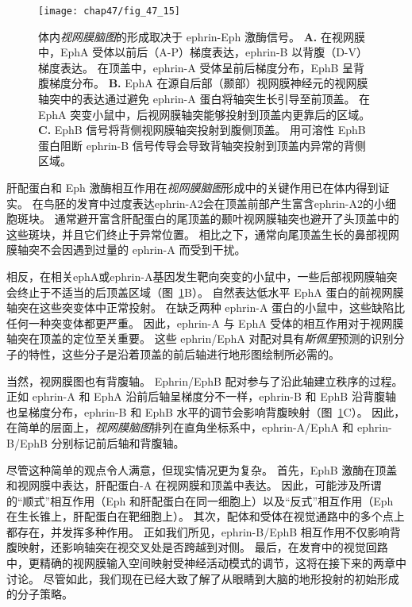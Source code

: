 \begin{figure}[htbp]
	\centering
	\texttt{[image: chap47/fig\_47\_15]}
	\caption{体内\textit{视网膜脑图}的形成取决于 ephrin-Eph 激酶信号。
		\textbf{A.} 在视网膜中，EphA 受体以前后（A-P）梯度表达，ephrin-B 以背腹（D-V）梯度表达。 
		在顶盖中，ephrin-A 受体呈前后梯度分布，EphB 呈背腹梯度分布。
		\textbf{B.} EphA 在源自后部（颞部）视网膜神经元的视网膜轴突中的表达通过避免 ephrin-A 蛋白将轴突生长引导至前顶盖。
		在 EphA 突变小鼠中，后视网膜轴突能够投射到顶盖内更靠后的区域。
		\textbf{C.} EphB 信号将背侧视网膜轴突投射到腹侧顶盖。
		用可溶性 EphB 蛋白阻断 ephrin-B 信号传导会导致背轴突投射到顶盖内异常的背侧区域。}
	\label{fig:47_15}
\end{figure}


肝配蛋白和 Eph 激酶相互作用在\textit{视网膜脑图}形成中的关键作用已在体内得到证实。
在鸟胚的发育中过度表达ephrin-A2会在顶盖前部产生富含ephrin-A2的小细胞斑块。
通常避开富含肝配蛋白的尾顶盖的颞叶视网膜轴突也避开了头顶盖中的这些斑块，并且它们终止于异常位置。
相比之下，通常向尾顶盖生长的鼻部视网膜轴突不会因遇到过量的 ephrin-A 而受到干扰。


相反，在相关ephA或ephrin-A基因发生靶向突变的小鼠中，一些后部视网膜轴突会终止于不适当的后顶盖区域（图~\ref{fig:47_15}B）。
自然表达低水平 EphA 蛋白的前视网膜轴突在这些突变体中正常投射。
在缺乏两种 ephrin-A 蛋白的小鼠中，这些缺陷比任何一种突变体都更严重。
因此，ephrin-A 与 EphA 受体的相互作用对于视网膜轴突在顶盖的定位至关重要。
这些 ephrin/EphA 对配对具有\textit{斯佩里}预测的识别分子的特性，这些分子是沿着顶盖的前后轴进行地形图绘制所必需的。


当然，视网膜图也有背腹轴。
Ephrin/EphB 配对参与了沿此轴建立秩序的过程。
正如 ephrin-A 和 EphA 沿前后轴呈梯度分不一样，ephrin-B 和 EphB 沿背腹轴也呈梯度分布，ephrin-B 和 EphB 水平的调节会影响背腹映射（图~\ref{fig:47_15}C）。
因此，在简单的层面上，\textit{视网膜脑图}排列在直角坐标系中，ephrin-A/EphA 和 ephrin-B/EphB 分别标记前后轴和背腹轴。


尽管这种简单的观点令人满意，但现实情况更为复杂。
首先，EphB 激酶在顶盖和视网膜中表达，肝配蛋白-A 在视网膜和顶盖中表达。
因此，可能涉及所谓的“顺式”相互作用（Eph 和肝配蛋白在同一细胞上）以及“反式”相互作用（Eph 在生长锥上，肝配蛋白在靶细胞上）。
其次，配体和受体在视觉通路中的多个点上都存在，并发挥多种作用。
正如我们所见，ephrin-B/EphB 相互作用不仅影响背腹映射，还影响轴突在视交叉处是否跨越到对侧。
最后，在发育中的视觉回路中，更精确的视网膜输入空间映射受神经活动模式的调节，这将在接下来的两章中讨论。
尽管如此，我们现在已经大致了解了从眼睛到大脑的地形投射的初始形成的分子策略。



